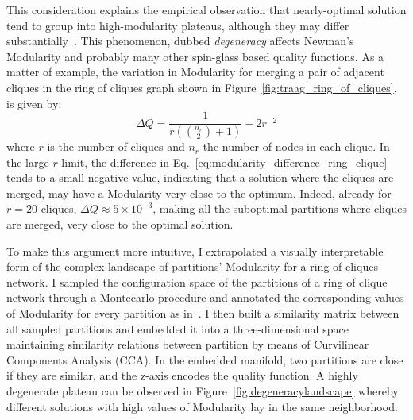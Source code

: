 This consideration explains the empirical observation that nearly-optimal solution tend to group into high-modularity plateaus, although they may differ substantially~\cite{good2009}. This phenomenon, dubbed \emph{degeneracy} affects Newman's Modularity and probably many other spin-glass based quality functions.
As a matter of example, the variation in Modularity for merging a pair of adjacent cliques in the ring of cliques graph shown in Figure~\ref{fig:traag_ring_of_cliques}, is given by:
\begin{equation}\label{eq:modularity_difference_ring_clique}
\Delta Q = \frac{1}{r\left(\binom{n_r}{2}+1\right)}-2r^{-2}
\end{equation}
where $r$ is the number of cliques and $n_r$ the number of nodes in each clique.
In the large $r$ limit, the difference in Eq.~\ref{eq:modularity_difference_ring_clique} tends to a small negative value, indicating that a solution where the cliques are merged, may have a Modularity very close to the optimum.
Indeed, already for $r=20$ cliques, $\Delta Q \approx 5\times 10^{-3}$, making all the suboptimal partitions where cliques are merged, very close to the optimal solution.

To make this argument more intuitive, I extrapolated a visually interpretable form of the complex landscape of partitions' Modularity for a ring of cliques network. I sampled the configuration space of the partitions of a ring of clique network through a Montecarlo procedure and annotated the corresponding values of Modularity for every partition as in~\cite{good2009}.
I then built a similarity matrix between all sampled partitions and embedded it into a three-dimensional space maintaining similarity relations between partition by means of Curvilinear Components Analysis (CCA).
In the embedded manifold, two partitions are close if they are similar, and the z-axis encodes the quality function.
A highly degenerate plateau can be observed in Figure~\ref{fig:degeneracylandscape} whereby different solutions with high values of Modularity lay in the same neighborhood.

